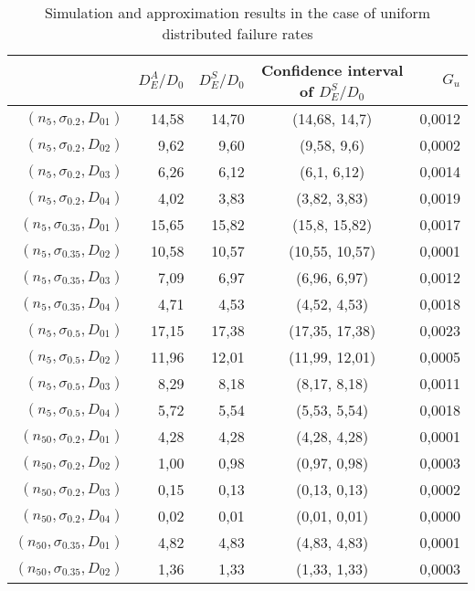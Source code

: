 \documentclass[preprint,12pt]{elsarticle}
\begin{document}
\begin{table}[htbp]
\small
  \centering
  \caption{Simulation and approximation results in the case of uniform distributed failure rates}
 \begin{tabular}{rrrcr}
    \toprule
          & $D_{E}^{A}/D_0$ & $D_{E}^{S}/D_0$ & Confidence interval of $D_{E}^{S}/D_0$ &  $G_{u}$ \\
    \midrule
    $(n_{5},\sigma_{0.2},D_{01})$ & 14,58 & 14,70 & (14,68, 14,7) & 0,0012 \\
    $(n_{5},\sigma_{0.2},D_{02})$  & 9,62  & 9,60  & (9,58, 9,6) & 0,0002 \\
    $(n_{5},\sigma_{0.2},D_{03})$  & 6,26  & 6,12  & (6,1, 6,12) & 0,0014 \\
    $(n_{5},\sigma_{0.2},D_{04})$  & 4,02  & 3,83  & (3,82, 3,83) & 0,0019 \\
    $(n_{5},\sigma_{0.35},D_{01})$ & 15,65 & 15,82 & (15,8, 15,82) & 0,0017 \\
    $(n_{5},\sigma_{0.35},D_{02})$ & 10,58 & 10,57 & (10,55, 10,57) & 0,0001 \\
    $(n_{5},\sigma_{0.35},D_{03})$ & 7,09  & 6,97  & (6,96, 6,97) & 0,0012 \\
    $(n_{5},\sigma_{0.35},D_{04})$ & 4,71  & 4,53  & (4,52, 4,53) & 0,0018 \\
    $(n_{5},\sigma_{0.5},D_{01})$ & 17,15 & 17,38 & (17,35, 17,38) & 0,0023 \\
    $(n_{5},\sigma_{0.5},D_{02})$ & 11,96 & 12,01 & (11,99, 12,01) & 0,0005 \\
    $(n_{5},\sigma_{0.5},D_{03})$ & 8,29  & 8,18  & (8,17, 8,18) & 0,0011 \\
    $(n_{5},\sigma_{0.5},D_{04})$ & 5,72  & 5,54  & (5,53, 5,54) & 0,0018\\
    $(n_{50},\sigma_{0.2},D_{01})$  & 4,28  & 4,28  & (4,28, 4,28) & 0,0001 \\
    $(n_{50},\sigma_{0.2},D_{02})$ & 1,00  & 0,98  & (0,97, 0,98) & 0,0003 \\
    $(n_{50},\sigma_{0.2},D_{03})$  & 0,15  & 0,13  & (0,13, 0,13) & 0,0002 \\
    $(n_{50},\sigma_{0.2},D_{04})$  & 0,02  & 0,01  & (0,01, 0,01) & 0,0000 \\
    $(n_{50},\sigma_{0.35},D_{01})$ & 4,82  & 4,83  & (4,83, 4,83) & 0,0001 \\
    $(n_{50},\sigma_{0.35},D_{02})$ & 1,36  & 1,33  & (1,33, 1,33) & 0,0003 \\

\end{tabular}
\end{table}
\end{document}
